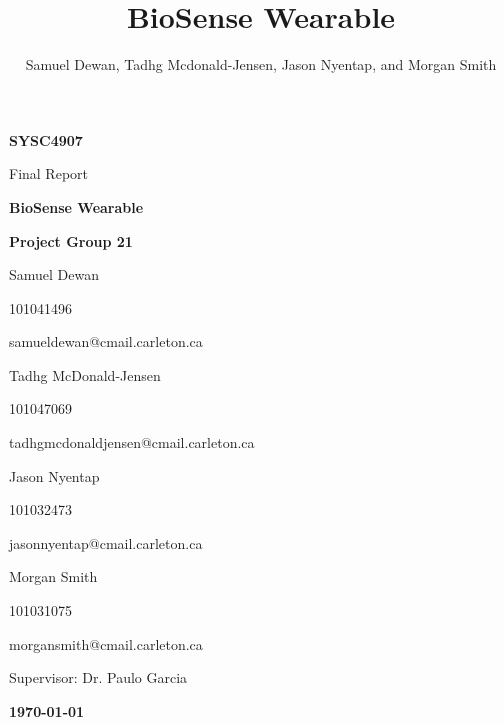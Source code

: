 \documentclass[11pt,letterpaper]{article}
\title{BioSense Wearable}
\author{Samuel Dewan, Tadhg Mcdonald-Jensen, Jason Nyentap, and Morgan Smith}
\begin{document}
\frenchspacing

\begin{titlepage}
\centering

{\large \textbf{SYSC4907}}

{\Huge \sffamily Final Report}

{\large \textbf{BioSense Wearable}}

\textbf{Project Group 21}

Samuel Dewan

{\footnotesize 101041496}

{\footnotesize samueldewan@cmail.carleton.ca}

Tadhg McDonald-Jensen

{\footnotesize 101047069}

{\footnotesize tadhgmcdonaldjensen@cmail.carleton.ca}

Jason Nyentap

{\footnotesize 101032473}

{\footnotesize jasonnyentap@cmail.carleton.ca}

Morgan Smith

{\footnotesize 101031075}

{\footnotesize morgansmith@cmail.carleton.ca}

Supervisor: Dr. Paulo Garcia


{\large \textbf{\today}}


\end{titlepage}


%

\tableofcontents
\clearpage

\end{document}
